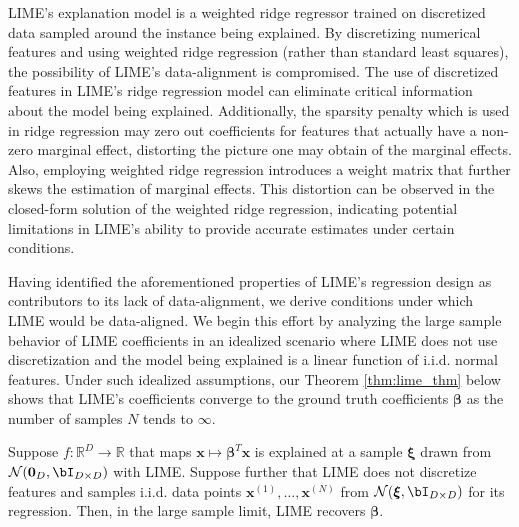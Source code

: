 \documentclass[11pt]{article}
\begin{document}
             LIME's explanation model is a weighted ridge regressor trained on discretized data sampled around the instance being explained. By discretizing numerical features and using weighted ridge regression (rather than standard least squares), the possibility of LIME's data-alignment is compromised. The use of discretized features in LIME's ridge regression model can eliminate critical information about the model being explained. Additionally, the sparsity penalty which is used in ridge regression may zero out coefficients for features that actually have a non-zero marginal effect, distorting the picture one may obtain of the marginal effects. Also, employing weighted ridge regression introduces a weight matrix that further skews the estimation of marginal effects. This distortion can be observed in the closed-form solution of the weighted ridge regression, indicating potential limitations in LIME's ability to provide accurate estimates under certain conditions.
             
              Having identified the aforementioned properties of LIME's regression design as contributors to its lack of data-alignment, we derive conditions under which LIME would be data-aligned. We begin this effort by analyzing the large sample behavior of LIME coefficients in an idealized scenario where LIME does not use discretization and the model being explained is a linear function of i.i.d. normal features. Under such idealized assumptions, our Theorem \ref{thm:lime_thm} below shows that LIME's coefficients converge to the ground truth coefficients $\boldsymbol{\beta}$ as the number of samples $N$ tends to $\infty$. %
            \begin{theorem}
                \label{thm:lime_thm}
                Suppose $f:\mathbb{R}^D\rightarrow \mathbb{R}$ that maps $\mathbf{x} \mapsto \boldsymbol{\beta}^T \mathbf{x}$ is explained at a sample $\boldsymbol{\xi}$ drawn from $\mathcal{N}(\mathbf{0}_D, \bI_{D\times D})$ with LIME. Suppose further that LIME does not discretize features and samples i.i.d. data points $\mathbf{x}^{(1)},\ldots,\mathbf{x}^{(N)}$ from $ \mathcal{N}(\boldsymbol{\xi}, \bI_{D\times D})$ for its regression.
                 Then, in the large sample limit, LIME recovers $\boldsymbol{\beta}$.  
            \end{theorem}
\end{document}
